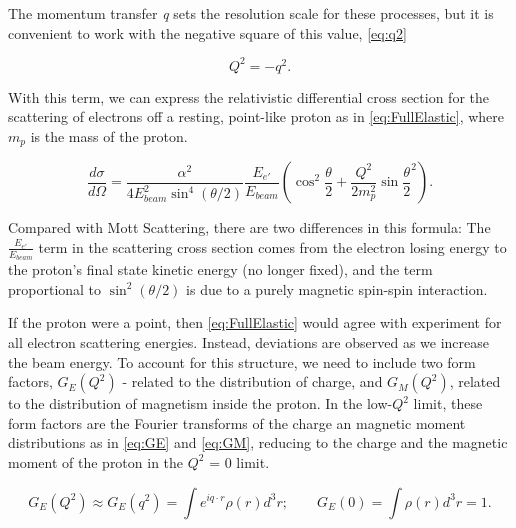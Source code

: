         The momentum transfer \textit{q} sets the resolution scale for these processes, but it is convenient to work with the negative square of this value, \eqref{eq:q2}

            \begin{equation}\label{eq:q2}
                Q^2 = -q^2.
            \end{equation}

        
        With this term, we can express the relativistic differential cross section for the scattering of electrons off a resting, point-like proton as in \eqref{eq:FullElastic}, where $m_p$ is the mass of the proton. 

            \begin{equation}\label{eq:FullElastic}
                    \frac{d\sigma}{d\Omega} = \frac{\alpha^2}{4E_{beam}^2\sin^4{(\theta/2)}} \frac{E_{e'}}{E_{beam}} ( \cos^2{\frac{\theta}{2}} + \frac{Q^2}{2m_p^2}\sin{\frac{\theta}{2}}^2 ).
            \end{equation}


            Compared with Mott Scattering, there are two differences in this formula: The $\frac{E_{e'}}{E_{beam}}$ term in the scattering cross section comes from the electron losing energy to the proton's final state kinetic energy (no longer fixed), and the term proportional to $\sin^2(\theta/2)$ is due to a purely magnetic spin-spin interaction. 


            \indent If the proton were a point, then \eqref{eq:FullElastic} would agree with experiment for all electron scattering energies. Instead, deviations are observed as we increase the beam energy. To account for this structure, we need to include two form factors, $G_E(Q^2)$ - related to the distribution of charge, and $G_M(Q^2)$, related to the distribution of magnetism inside the proton. In the low-$Q^2$ limit, these form factors are the Fourier transforms of the charge an magnetic moment distributions as in \eqref{eq:GE} and \eqref{eq:GM}, reducing to the charge and the magnetic moment of the proton in the $Q^2$ = 0 limit. %

        \begin{equation}\label{eq:GE}
             G_E(Q^2) \approx G_E(q^2) = \int e^{iq\cdot r} \rho (r) d^3r; \quad \quad    G_E(0) = \int  \rho (r) d^3r = 1. 
        \end{equation}

